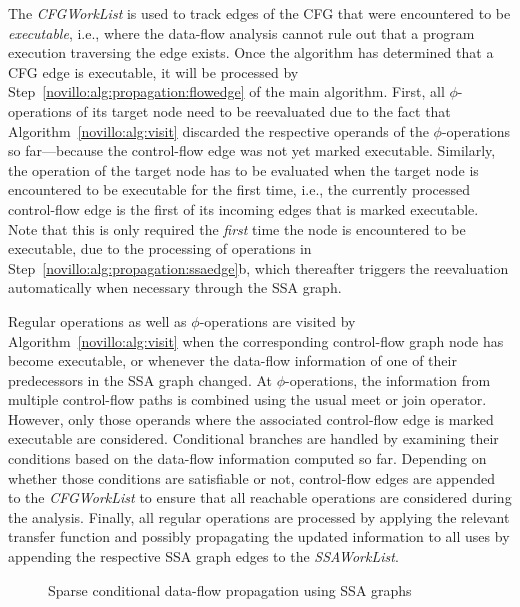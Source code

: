 The \emph{CFGWorkList} is used to track edges of the CFG that were encountered
to be \emph{executable}, i.e., where the data-flow analysis cannot rule out that
a program execution traversing the edge exists. Once the algorithm has
determined that a CFG edge is executable, it will be processed by
Step~\ref{novillo:alg:propagation:flowedge} of the main algorithm. First, all
$\phi$-operations of its target node need to be reevaluated due to the fact that
Algorithm~\ref{novillo:alg:visit} discarded the respective operands of the
$\phi$-operations so far---because the control-flow edge was not yet marked
executable.
Similarly, the operation of the target node has to be evaluated when the target
node is encountered to be executable for the first time, i.e., the currently
processed control-flow edge is the first of its incoming edges that is marked
executable. Note that this is only required the \emph{first} time the node is
encountered to be executable, due to the processing of operations in
Step~\ref{novillo:alg:propagation:ssaedge}b, which thereafter triggers the
reevaluation automatically when necessary through the SSA graph.

Regular operations as well as $\phi$-operations are visited by
Algorithm~\ref{novillo:alg:visit} when the corresponding control-flow graph node
has become executable, or whenever the data-flow information of one of their
predecessors in the SSA graph changed. At $\phi$-operations, the
information
from multiple control-flow paths is combined using the usual meet or join
operator. However, only those operands where the associated control-flow edge is
marked executable are considered. Conditional
branches are handled by examining their conditions based on the data-flow
information computed so far. Depending on whether those conditions are
satisfiable or not, control-flow edges are appended to the \emph{CFGWorkList} 
to ensure that all reachable operations are considered during the analysis.
Finally, all regular operations are processed by applying the relevant transfer
function and possibly propagating the updated information to all uses by
appending the respective SSA graph edges to the \emph{SSAWorkList}.

\begin{figure}[t]
  \caption{Sparse conditional data-flow propagation using SSA graphs}
  \label{fig:constant_propagation_is_easier:ssa_propagation}
\end{figure}

